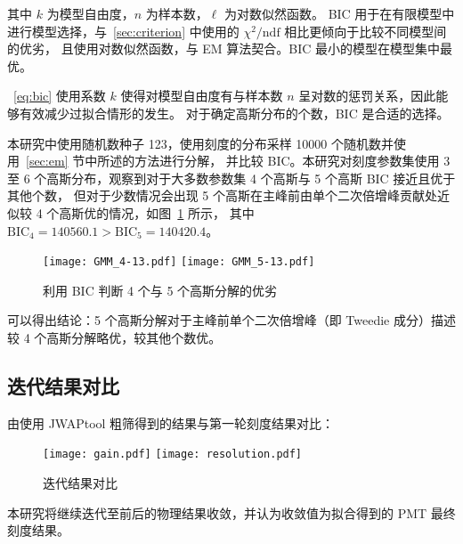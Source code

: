 其中 $k$ 为模型自由度，$n$ 为样本数，$\ell$ 为对数似然函数。
BIC 用于在有限模型中进行模型选择，与~\ref{sec:criterion} 中使用的 $\chi^2/\text{ndf}$ 相比更倾向于比较不同模型间的优劣，
且使用对数似然函数，与 EM 算法契合。BIC 最小的模型在模型集中最优\cite{10.1214/aos/1176344136}。

~\eqref{eq:bic} 使用系数 $k$ 使得对模型自由度有与样本数 $n$ 呈对数的惩罚关系，因此能够有效减少过拟合情形的发生。
对于确定高斯分布的个数，BIC 是合适的选择。

本研究中使用随机数种子 123，使用刻度的分布采样 10000 个随机数并使用~\ref{sec:em} 节中所述的方法进行分解，
并比较 BIC。本研究对刻度参数集使用 3 至 6 个高斯分布，观察到对于大多数参数集 4 个高斯与 5 个高斯 BIC 接近且优于其他个数，
但对于少数情况会出现 5 个高斯在主峰前由单个二次倍增峰贡献处近似较 4 个高斯优的情况，如图~\ref{fig:multi-image} 所示，
其中 $\text{BIC}_4=140560.1>\text{BIC}_5=140420.4$。

\begin{figure}
    \centering
      {\texttt{[image: GMM\_4-13.pdf]}}
      {\texttt{[image: GMM\_5-13.pdf]}}
    \caption{利用 BIC 判断 4 个与 5 个高斯分解的优劣}
    \label{fig:multi-image}
\end{figure}

可以得出结论：5 个高斯分解对于主峰前单个二次倍增峰（即 Tweedie 成分）描述较 4 个高斯分解略优，较其他个数优。

\subsection{迭代结果对比}
由使用 JWAPtool 粗筛得到的结果与第一轮刻度结果对比：
\begin{figure}
    \centering
      {\texttt{[image: gain.pdf]}}
      {\texttt{[image: resolution.pdf]}}
    \caption{迭代结果对比}
\end{figure}

本研究将继续迭代至前后的物理结果收敛，并认为收敛值为拟合得到的 PMT 最终刻度结果。
